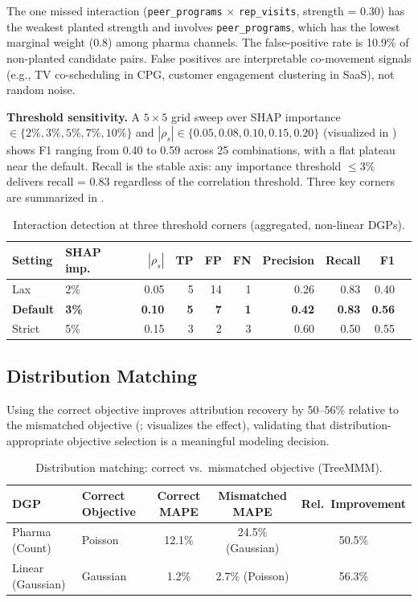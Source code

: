 \documentclass[review,12pt]{elsarticle}
\begin{document}
The one missed interaction (\texttt{peer\_programs} $\times$ \texttt{rep\_visits},
strength = 0.30) has the weakest planted strength and involves
\texttt{peer\_programs}, which has the lowest marginal weight (0.8) among
pharma channels. The false-positive rate is 10.9\% of non-planted candidate
pairs. False positives are interpretable co-movement signals (e.g., TV
co-scheduling in CPG, customer engagement clustering in SaaS), not random noise.

\textbf{Threshold sensitivity.} A $5 \times 5$ grid sweep over SHAP importance
$\in \{2\%, 3\%, 5\%, 7\%, 10\%\}$ and $|\rho_s| \in \{0.05, 0.08, 0.10, 0.15, 0.20\}$
(visualized in ) shows F1 ranging from 0.40 to 0.59 across
25 combinations, with a flat plateau near the default. Recall is the stable
axis: any importance threshold $\leq 3$\% delivers recall = 0.83 regardless
of the correlation threshold. Three key corners are summarized in
.

\begin{table}[ht]
\centering
\caption{Interaction detection at three threshold corners (aggregated, non-linear DGPs).}
\label{tab:threshold}
\begin{tabular}{@{}llrrrrrrrr@{}}
\toprule
Setting & SHAP imp. & $|\rho_s|$ & TP & FP & FN & Precision & Recall & F1 \\
\midrule
Lax        & 2\% & 0.05 & 5 & 14 & 1 & 0.26 & 0.83 & 0.40 \\
\textbf{Default} & \textbf{3\%} & \textbf{0.10} & \textbf{5} & \textbf{7} & \textbf{1} & \textbf{0.42} & \textbf{0.83} & \textbf{0.56} \\
Strict     & 5\% & 0.15 & 3 &  2 & 3 & 0.60 & 0.50 & 0.55 \\
\bottomrule
\end{tabular}
\end{table}

\subsection{Distribution Matching}
\label{sec:results:distribution}

Using the correct objective improves attribution recovery by 50--56\% relative
to the mismatched objective (; 
visualizes the effect), validating that distribution-appropriate objective
selection is a meaningful modeling decision.

\begin{table}[ht]
\centering
\caption{Distribution matching: correct vs.\ mismatched objective (TreeMMM).}
\label{tab:distmatch}
\small
\begin{tabularx}{\linewidth}{@{}LLCCC@{}}
\toprule
DGP & Correct Objective & Correct MAPE & Mismatched MAPE & Rel.\ Improvement \\
\midrule
Pharma (Count)    & Poisson  & 12.1\% & 24.5\% (Gaussian) & 50.5\% \\
Linear (Gaussian) & Gaussian & 1.2\%  & 2.7\%  (Poisson)  & 56.3\% \\
\bottomrule
\end{tabularx}
\end{table}
\end{document}
